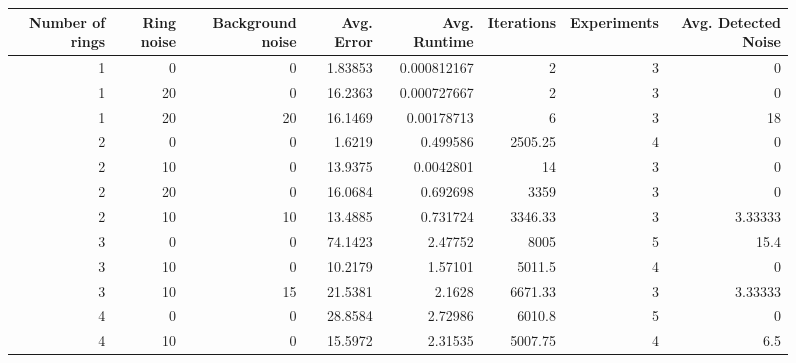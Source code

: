 \documentclass[conference]{IEEEtran}
\begin{document}
\begin{figure*}[!ht]
\centering
\begin{tabular}{rrrrrrrr}
    \hline
       Number of rings &   Ring noise &   Background noise &   Avg. Error &   Avg. Runtime &   Iterations &   Experiments &   Avg. Detected Noise \\
    \hline
                     1 &            0 &                  0 &      1.83853 &    0.000812167 &         2    &             3 &               0       \\
                     1 &           20 &                  0 &     16.2363  &    0.000727667 &         2    &             3 &               0       \\
                     1 &           20 &                 20 &     16.1469  &    0.00178713  &         6    &             3 &              18       \\
                     2 &            0 &                  0 &      1.6219  &    0.499586    &      2505.25 &             4 &               0       \\
                     2 &           10 &                  0 &     13.9375  &    0.0042801   &        14    &             3 &               0       \\
                     2 &           20 &                  0 &     16.0684  &    0.692698    &      3359    &             3 &               0       \\
                     2 &           10 &                 10 &     13.4885  &    0.731724    &      3346.33 &             3 &               3.33333 \\
                     3 &            0 &                  0 &     74.1423  &    2.47752     &      8005    &             5 &              15.4     \\
                     3 &           10 &                  0 &     10.2179  &    1.57101     &      5011.5  &             4 &               0       \\
                     3 &           10 &                 15 &     21.5381  &    2.1628      &      6671.33 &             3 &               3.33333 \\
                     4 &            0 &                  0 &     28.8584  &    2.72986     &      6010.8  &             5 &               0       \\
                     4 &           10 &                  0 &     15.5972  &    2.31535     &      5007.75 &             4 &               6.5     \\

\end{tabular}
\end{figure*}
\end{document}
